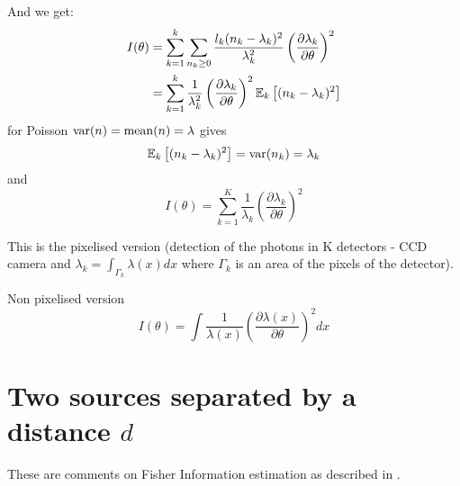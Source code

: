 And we get:
%
\begin{align*}
	I(\theta) 
	& =\sum_{k=1}^k\sum_{n_k\geq0}\frac{l_k(n_k-\lambda_k)^2}{\lambda_k^2}\left(\frac{\partial\lambda_k}{\partial\theta}\right)^2\\
	& =\sum_{k=1}^k\frac{1}{\lambda_k^2}\left(\frac{\partial\lambda_k}{\partial\theta}\right)^2\mathbb{E}_k\left[(n_k-\lambda_k)^2\right]
\end{align*}
%
for Poisson $\mathrm{var}(n)=\mathrm{mean}(n)=\lambda$ gives 
%
\begin{equation}
	\mathbb{E}_k\left[(n_k-\lambda_k)^2\right]=\mathrm{var}(n_k)=\lambda_k
\end{equation}
%
and 
%
\begin{equation}
	I(\theta)=\sum_{k=1}^K\frac{1}{\lambda_k}\left(\frac{\partial\lambda_k}{\partial\theta}\right)^2\label{eq:Fisher Info for Poisson}
\end{equation}

This is the pixelised version (detection of the photons in K detectors - CCD camera and $\lambda_k=\int_{\Gamma_k}\lambda(x)dx$ where $\Gamma_k$ is an area of the pixels of the detector). 

Non pixelised version \cite{Ram2006}
%
\begin{equation}
	I(\theta)=\int\frac{1}{\lambda(x)}\left(\frac{\partial\lambda(x)}{\partial\theta}\right)^2dx
\end{equation}

\clearpage{}
\section{Two sources separated by a distance $d$\label{sub:Two-sources-separated}}

These are comments on Fisher Information estimation as described in \cite{Ram2006}.

